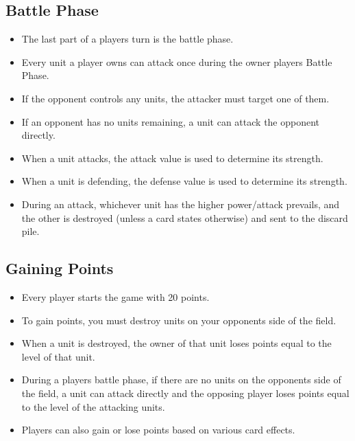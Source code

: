 \subsection{Battle Phase}
\begin{itemize}
    \item The last part of a players turn is the battle phase.
    \item Every unit a player owns can attack once during the owner players Battle Phase.
    \item If the opponent controls any units, the attacker must target one of them.
    \item If an opponent has no units remaining, a unit can attack the opponent directly.
    \item When a unit attacks, the attack value is used to determine its strength.
    \item When a unit is defending, the defense value is used to determine its strength.
    \item During an attack, whichever unit has the higher power/attack prevails, and the other is destroyed (unless a card states otherwise) and sent to the discard pile.
\end{itemize}








\subsection{Gaining Points}
\begin{itemize}
    \item Every player starts the game with 20 points.
    \item To gain points, you must destroy units on your opponents side of the field.
    \item When a unit is destroyed, the owner of that unit loses points equal to the level of that unit.
    \item During a players battle phase, if there are no units on the opponents side of the field, a unit can attack directly and the opposing player loses points equal to the level of the attacking units.
    \item Players can also gain or lose points based on various card effects.
\end{itemize}








